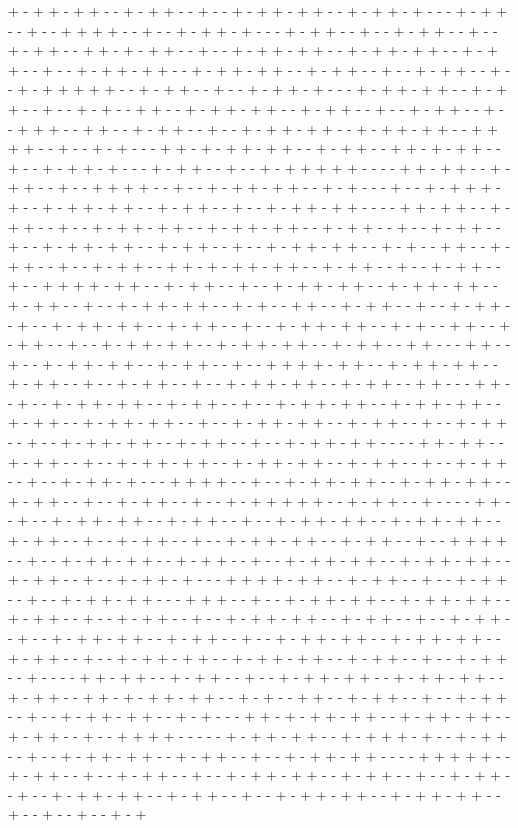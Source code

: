 + - + + - + + - - + - + + - - + - - + - + + - + + - - + - + + - + - - - + - + + - - + - - + + + + - - + - - + - + + - + - - - + - + + - - + - - + - + + - - + - - + - + + - - + + - + - + + - - + - - + - + + - + + - - + - + + - + + - - + - + + - - + - - + - + + - + + - - + - + + - + + - - + - + + - - + - - + - + + - - + - - + - + + + + + - - + - + + - - + - - + - + + - + - - - + - + + - + + - - + - + + - - + - - + - + - - + + - - + - + + - + + - - + - + + - - + - - + - + + - - + - - + + + - - + + - - + - + + - - + - - + - + + - + + - - + - + + - + + - - + + + + - - + - - + - + - - - + + - + - + + - + + - - + - + + - - + + - + - + + - - + - - + - + + - + - - - + - + + - - + - - + - + + + + + - - - - + + - + + - - + - + + - - + - - + + + + - - + - - + - + + - + + - - + - + - - - + - - + - + + + - + - - + - + + - + + - - + - + + - - + - - + - + + - + + - - - - + + - + + - - + - + + - - + - - + - + + - + + - - + - + + - + + - - + - + + - - + - - + - + + - - + - - + - + + - + + - - + - + + - - + - - + - + + - + + - - + - + - - + + - - + - + + - - + - - + - + + - - + + - + - + + - + + - - + - + + - - + - - + - + + - - + - - + + + + - + + - - + - + + - - + - - + - + + - + + - - + - + + - + + - - + - + + - - + - - + - + + - + + - - + - + - - + + - - + - + + - - + - - + - + + - - + - - + - + + - + + - - + - + + - - + - - + - + + - + + - - + - + - - + + - - + - + + - - + - - + - + + - + + - - + - + + - + + - - + - + + - - + + - - - + + - - + - - + - + + - + + - - + - + + - - + - - + + + + - + + - - + - + + - + + - - + - + + - - + - - + - + + - - + - - + - + + - + + - - + - + + - - + + - - - + + - - + - - + - + + - + + - - + - + + - - + - - + - + + - + + - - + - + + - + + - - + - + + - - + - + + - + + - - + - - + - + + - + + - - + - + + - - + - - + - + + - - + - - + - + + - + + - - + - + + - - + - - + - + + - + + - - - - + + - + + - - + - + + - - + - - + - + + - + + - - + - + + - + + - - + - + + - - + - - + - + + - - + - - + - + + - + - - - + + + + - - + - - + - + + - + + - - + - + + - + + - - + - + + - - + - - + - + + - - + - - + - + + + + + - - + - + + - - + - - - - + + - - + - - + - + + - + + - - + - + + - - + - - + - + + - + + - - + - + + - + + - - + - + + - - + - - + - + + - - + - - + - + + - + + - - + - + + - - + - - + + + + - - + - - + - + + - + + - - + - + + - - + - - + - + + - + + - - + - + + - + + - - + - + + - - + - - + - + + - + - - - + + + + - + + - - + - + + - - + - - + - + + - - + - - + - + + - + + - - - + + + - - + - - + - + + - + + - - + - + + - + + - - + - + + - - + - - + - + + - - + - - + - + + - + + - - + - + + - - + - - + - + + - - + - - + - + + - + + - - + - + + - - + - - + - + + - + + - - + - + + - + + - - + - + + - - + - - + - + + - + + - - + - + + - + + - - + - + + - - + - - + - + + - - + - - - - + + - + + - - + - + + - - + - - + - + + - + + - - + - + + - + + - - + - + + - - + + - + - + + - + + - - + - + - - + + - - + - + + - - + - - + - + + - - + - - + - + + - + + - - + - + - - - + + - + - + + - + + - - + - + + - + + - - + - + + - - + - - + + + + - - - - - + - + + - + + - - + - + + + - + - - + - + + - - + - - + - + + - + + - - + - + + - - + - - + - + + - + + - - - - + + + + + - - + - + + - - + - - + - + + - - + - - + - + + - + + - - + - + + - - + - - + - + + - - + - - + - + + - + + - - + - + + - - + - - + - + + - + + - - + - + + - + + - - + - - + - - + - - + - + 